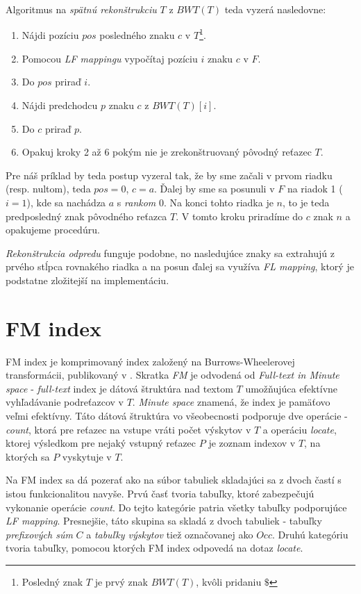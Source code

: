     Algoritmus na \emph{spätnú rekonštrukciu} $T$ z $BWT(T)$ teda vyzerá nasledovne:
    
    \begin{enumerate}
        \item{Nájdi pozíciu $pos$ posledného znaku $c$ v $T$\footnote{Posledný znak $T$ je prvý znak $BWT(T)$, kvôli pridaniu $\$$}.}
        \item{Pomocou \emph{LF mappingu} vypočítaj pozíciu $i$ znaku $c$ v $F$.}
        \item{Do $pos$ priraď $i$.}
        \item{Nájdi predchodcu $p$ znaku $c$ z $BWT(T)[i]$.}
        \item{Do $c$ priraď $p$.}
        \item{Opakuj kroky 2 až 6 pokým nie je zrekonštruovaný pôvodný reťazec $T$.}
    \end{enumerate}
    
    Pre náš príklad by teda postup vyzeral tak, že by sme začali v prvom riadku (resp. nultom), teda $pos = 0$, $c = a$. Ďalej by sme sa posunuli v $F$ na riadok 1 ($i = 1$), kde sa nachádza $a$ s \emph{rankom} 0. Na konci tohto riadka je $n$, to je teda predposledný znak pôvodného reťazca $T$. V tomto kroku priradíme do $c$ znak $n$ a opakujeme procedúru.
    
    \emph{Rekonštrukcia odpredu} funguje podobne, no nasledujúce znaky sa extrahujú z prvého stĺpca rovnakého riadka a na posun ďalej sa využíva \emph{FL mapping}, ktorý je podstatne zložitejší na implementáciu.
    
    
\section{FM index}  
    FM index je komprimovaný index založený na Burrows-Wheelerovej transformácii, publikovaný v \cite{FM00}. Skratka \emph{FM} je odvodená od \emph{Full-text in Minute space} - \emph{full-text} index je dátová štruktúra nad textom $T$ umožňujúca efektívne vyhľadávanie podreťazcov v $T$. \emph{Minute space} znamená, že index je pamäťovo veľmi efektívny. Táto dátová štruktúra vo všeobecnosti podporuje dve operácie - \emph{count}, ktorá pre reťazec na vstupe vráti počet výskytov v $T$ a operáciu \emph{locate}, ktorej výsledkom pre nejaký vstupný reťazec $P$ je zoznam indexov v $T$, na ktorých sa $P$ vyskytuje v $T$.
    
    Na FM index sa dá pozerať ako na súbor tabuliek skladajúci sa z dvoch častí s istou funkcionalitou navyše. Prvú časť tvoria tabuľky, ktoré zabezpečujú vykonanie operácie \emph{count}. Do tejto kategórie patria všetky tabuľky podporujúce \emph{LF mapping}. Presnejšie, táto skupina sa skladá z dvoch tabuliek - tabuľky \emph{prefixových súm} $C$ a \emph{tabuľky výskytov} tiež označovanej ako $Occ$. Druhú kategóriu tvoria tabuľky, pomocou ktorých FM index odpovedá na dotaz \emph{locate}.
    
